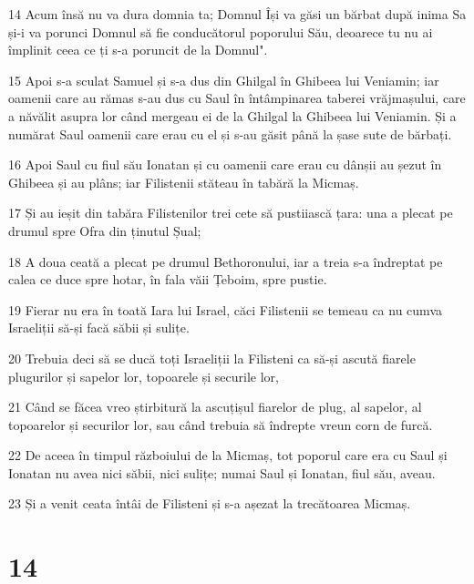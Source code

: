 \par 14 Acum însă nu va dura domnia ta; Domnul Își va găsi un bărbat după inima Sa și-i va porunci Domnul să fie conducătorul poporului Său, deoarece tu nu ai împlinit ceea ce ți s-a poruncit de la Domnul".
\par 15 Apoi s-a sculat Samuel și s-a dus din Ghilgal în Ghibeea lui Veniamin; iar oamenii care au rămas s-au dus cu Saul în întâmpinarea taberei vrăjmașului, care a năvălit asupra lor când mergeau ei de la Ghilgal la Ghibeea lui Veniamin. Și a numărat Saul oamenii care erau cu el și s-au găsit până la șase sute de bărbați.
\par 16 Apoi Saul cu fiul său Ionatan și cu oamenii care erau cu dânșii au șezut în Ghibeea și au plâns; iar Filistenii stăteau în tabără la Micmaș.
\par 17 Și au ieșit din tabăra Filistenilor trei cete să pustiiască țara: una a plecat pe drumul spre Ofra din ținutul Șual;
\par 18 A doua ceată a plecat pe drumul Bethoronului, iar a treia s-a îndreptat pe calea ce duce spre hotar, în fala văii Țeboim, spre pustie.
\par 19 Fierar nu era în toată Iara lui Israel, căci Filistenii se temeau ca nu cumva Israeliții să-și facă săbii și sulițe.
\par 20 Trebuia deci să se ducă toți Israeliții la Filisteni ca să-și ascută fiarele plugurilor și sapelor lor, topoarele și securile lor,
\par 21 Când se făcea vreo știrbitură la ascuțișul fiarelor de plug, al sapelor, al topoarelor și securilor lor, sau când trebuia să îndrepte vreun corn de furcă.
\par 22 De aceea în timpul războiului de la Micmaș, tot poporul care era cu Saul și Ionatan nu avea nici săbii, nici sulițe; numai Saul și Ionatan, fiul său, aveau.
\par 23 Și a venit ceata întâi de Filisteni și s-a așezat la trecătoarea Micmaș.

\chapter{14}

